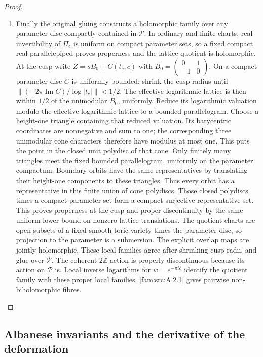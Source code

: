 \begin{proof}
\begin{enumerate}[label=\arabic*.,leftmargin=*]
\item Finally the original gluing constructs a holomorphic family over any parameter disc compactly contained in $\mathcal P$. In ordinary and finite charts, real invertibility of $\Pi_c$ is uniform on compact parameter sets, so a fixed compact real parallelepiped proves properness and the lattice quotient is holomorphic. At the cusp write $Z=sB_0+C(t_c,c)$ with $B_0=\left(\begin{smallmatrix}0&1\\-1&0\end{smallmatrix}\right)$. On a compact parameter disc $C$ is uniformly bounded; shrink the cusp radius until
$\|(-2\pi\operatorname{Im}C)/\log|t_c|\|<1/2$. The effective logarithmic lattice is then within $1/2$ of the unimodular $B_0$, uniformly. Reduce its logarithmic valuation modulo the effective logarithmic lattice to a bounded parallelogram. Choose a height-one triangle containing that reduced valuation. Its barycentric coordinates are nonnegative and sum to one; the corresponding three unimodular cone characters therefore have modulus at most one. This puts the point in the closed unit polydisc of that cone. Only finitely many triangles meet the fixed bounded parallelogram, uniformly on the parameter compactum. Boundary orbits have the same representatives by translating their height-one components to these triangles. Thus every orbit has a representative in this finite union of cone polydiscs. Those closed polydiscs times a compact parameter set form a compact surjective representative set. This proves properness at the cusp and proper discontinuity by the same uniform lower bound on nonzero lattice translations. The quotient charts are open subsets of a fixed smooth toric variety times the parameter disc, so projection to the parameter is a submersion. The explicit overlap maps are jointly holomorphic. These local families agree after shrinking cusp radii, and glue over $\mathcal P$. The coherent $2\mathbb Z$ action is properly discontinuous because its action on $\mathcal P$ is. Local inverse logarithms for $w=e^{-\pi ic}$ identify the quotient family with these proper local families. \ref{fam:src:A.2.1} gives pairwise non-biholomorphic fibres.
\end{enumerate}
\end{proof}

\subsection{Albanese invariants and the derivative of the deformation}\label{fam:section:A.4}

